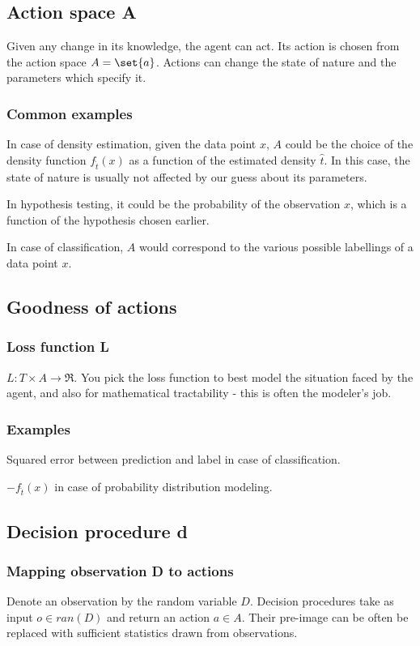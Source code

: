 \documentclass[oneside, article]{memoir}
\begin{document}
\subsection{Action space A}
Given any change in its knowledge, the agent can act. Its action is chosen from the action space $A = \set{a}$. Actions can change the state of nature and the parameters which specify it.

\subsubsection{Common examples}
In case of density estimation, given the data point $x$, $A$ could be the choice of the density function $f_{\hat{t}}(x)$ as a function of the estimated density $\hat{t}$. In this case, the state of nature is usually not affected by our guess about its parameters.

In hypothesis testing, it could be the probability of the observation $x$, which is a function of the hypothesis chosen earlier.

In case of classification, $A$ would correspond to the various possible labellings of a data point $x$.

\subsection{Goodness of actions}
\subsubsection{Loss function L}
$L:T\times A \to \Re$. You pick the loss function to best model the situation faced by the agent, and also for mathematical tractability - this is often the modeler's job.

\subsubsection{Examples}
Squared error between prediction and label in case of classification.

$-f_{\hat{t}}(x)$ in case of probability distribution modeling.

\subsection{Decision procedure d}
\subsubsection{Mapping observation D to actions}
Denote an observation by the random variable $D$. Decision procedures take as input $o \in ran(D)$ and return an action $a \in A$. Their pre-image can be often be replaced with sufficient statistics drawn from observations.
\end{document}
